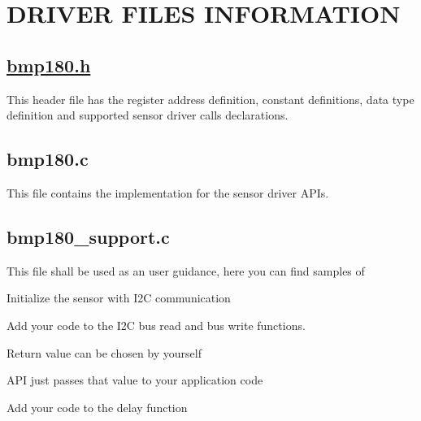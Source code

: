 \section*{D\+R\+I\+V\+ER F\+I\+L\+ES I\+N\+F\+O\+R\+M\+A\+T\+I\+ON }

\subsection*{\hyperlink{bmp180_8h}{bmp180.\+h} }


\begin{DoxyItemize}
\item This header file has the register address definition, constant definitions, data type definition and supported sensor driver calls declarations.
\end{DoxyItemize}

\subsection*{bmp180.\+c }


\begin{DoxyItemize}
\item This file contains the implementation for the sensor driver A\+P\+Is.
\end{DoxyItemize}

\subsection*{bmp180\+\_\+support.\+c }


\begin{DoxyItemize}
\item This file shall be used as an user guidance, here you can find samples of
\begin{DoxyItemize}
\item Initialize the sensor with I2C communication
\begin{DoxyItemize}
\item Add your code to the I2C bus read and bus write functions.
\begin{DoxyItemize}
\item Return value can be chosen by yourself
\end{DoxyItemize}
\end{DoxyItemize}
\end{DoxyItemize}
\end{DoxyItemize}

A\+PI just passes that value to your application code
\begin{DoxyItemize}
\item Add your code to the delay function
\end{DoxyItemize}

